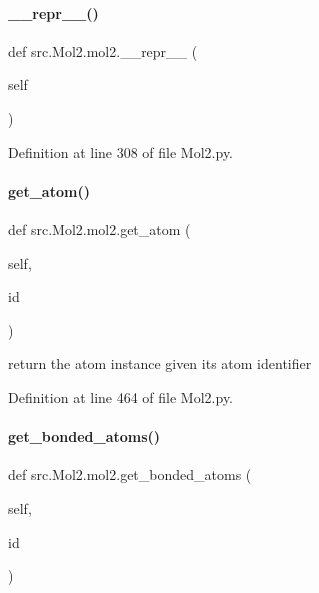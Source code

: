 \paragraph{\texorpdfstring{\+\_\+\+\_\+repr\+\_\+\+\_\+()}{\_\_repr\_\_()}}
{\footnotesize\ttfamily def src.\+Mol2.\+mol2.\+\_\+\+\_\+repr\+\_\+\+\_\+ (\begin{DoxyParamCaption}\item[{}]{self }\end{DoxyParamCaption})}



Definition at line 308 of file Mol2.\+py.

\mbox{\label{classsrc_1_1Mol2_1_1mol2_a1feb64ba646d7dc2c86b608f81940373}} 
\paragraph{\texorpdfstring{get\+\_\+atom()}{get\_atom()}}
{\footnotesize\ttfamily def src.\+Mol2.\+mol2.\+get\+\_\+atom (\begin{DoxyParamCaption}\item[{}]{self,  }\item[{}]{id }\end{DoxyParamCaption})}



return the atom instance given its atom identifier 



Definition at line 464 of file Mol2.\+py.

\mbox{\label{classsrc_1_1Mol2_1_1mol2_a85de5060effdb6a854a5cad7f511bf30}} 
\paragraph{\texorpdfstring{get\+\_\+bonded\+\_\+atoms()}{get\_bonded\_atoms()}}
{\footnotesize\ttfamily def src.\+Mol2.\+mol2.\+get\+\_\+bonded\+\_\+atoms (\begin{DoxyParamCaption}\item[{}]{self,  }\item[{}]{id }\end{DoxyParamCaption})}



